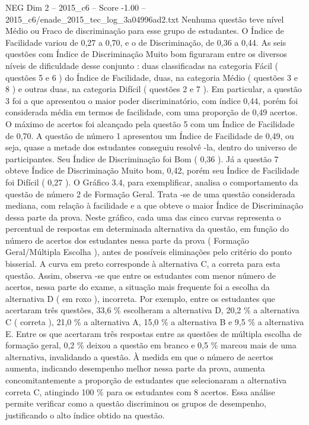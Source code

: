\begin{textsample}{NEG Dim 2 – 2015\_c6 – Score -1.00 – 2015\_c6/enade\_2015\_tec\_log\_3a04996ad2.txt}
Nenhuma questão teve nível Médio ou Fraco de discriminação para esse grupo de estudantes.
O Índice de Facilidade variou de 0,27 a 0,70, e o de Discriminação, de 0,36 a 0,44.
As seis questões com Índice de Discriminação Muito bom figuraram entre os diversos níveis de dificuldade desse conjunto : duas classificadas na categoria Fácil ( questões 5 e 6 ) do Índice de Facilidade, duas, na categoria Médio ( questões 3 e 8 ) e outras duas, na categoria Difícil ( questões 2 e 7 ).
Em particular, a questão 3 foi a que apresentou o maior poder discriminatório, com índice 0,44, porém foi considerada média em termos de facilidade, com uma proporção de 0,49 acertos.
O máximo de acertos foi alcançado pela questão 5 com um Índice de Facilidade de 0,70.
A questão de número 1 apresentou um Índice de Facilidade de 0,49, ou seja, quase a metade dos estudantes conseguiu resolvê -la, dentro do universo de participantes.
Seu Índice de Discriminação foi Bom ( 0,36 ).
Já a questão 7 obteve Índice de Discriminação Muito bom, 0,42, porém seu Índice de Facilidade foi Difícil ( 0,27 ).
O Gráfico 3.4, para exemplificar, analisa o comportamento da questão de número 2 de Formação Geral.
Trata -se de uma questão considerada mediana, com relação à facilidade e a que obteve o maior Índice de Discriminação dessa parte da prova.
Neste gráfico, cada uma das cinco curvas representa o percentual de respostas em determinada alternativa da questão, em função do número de acertos dos estudantes nessa parte da prova ( Formação Geral/Múltipla Escolha ), antes de possíveis eliminações pelo critério do ponto bisserial.
A curva em preto corresponde à alternativa C, a correta para esta questão.
Assim, observa -se que entre os estudantes com menor número de acertos, nessa parte do exame, a situação mais frequente foi a escolha da alternativa D ( em roxo ), incorreta.
Por exemplo, entre os estudantes que acertaram três questões, 33,6 \% escolheram a alternativa D, 20,2 \% a alternativa C ( correta ), 21,0 \% a alternativa A, 15,0 \% a alternativa B e 9,5 \% a alternativa E.
Entre os que acertaram três respostas entre as questões de múltipla escolha de formação geral, 0,2 \% deixou a questão em branco e 0,5 \% marcou mais de uma alternativa, invalidando a questão.
À medida em que o número de acertos aumenta, indicando desempenho melhor nessa parte da prova, aumenta concomitantemente a proporção de estudantes que selecionaram a alternativa correta C, atingindo 100 \% para os estudantes com 8 acertos.
Essa análise permite verificar como a questão discriminou os grupos de desempenho, justificando o alto índice obtido na questão.

\end{textsample}

